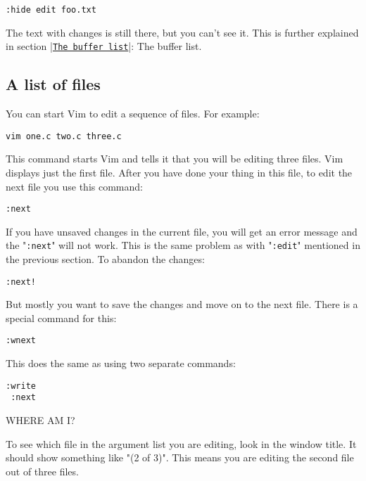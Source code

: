  \begin{Verbatim}[samepage=true]
 :hide edit foo.txt
 \end{Verbatim}

The text with changes is still there, but you can't see it.
This is further explained in section |\hyperref[The buffer list]{\texttt{The buffer list}}|: The buffer list.

\subsection{A list of files}
You can start Vim to edit a sequence of files.  For example:

 \begin{Verbatim}[samepage=true]
 vim one.c two.c three.c
 \end{Verbatim}

This command starts Vim and tells it that you will be editing three files.
Vim displays just the first file.
After you have done your thing in this file, to edit the next file you use this command:

 \begin{Verbatim}[samepage=true]
 :next
 \end{Verbatim}

If you have unsaved changes in the current file, you will get an error message and the "\verb!:next!" will not work.
This is the same problem as with "\verb!:edit!" mentioned in the previous section.
To abandon the changes:

 \begin{Verbatim}[samepage=true]
 :next!
 \end{Verbatim}

But mostly you want to save the changes and move on to the next file.
There is a special command for this:

 \begin{Verbatim}[samepage=true]
 :wnext
 \end{Verbatim}

This does the same as using two separate commands:

 \begin{Verbatim}[samepage=true]
 :write
 :next
 \end{Verbatim}

WHERE AM I?

To see which file in the argument list you are editing, look in the window title.
It should show something like "(2 of 3)".
This means you are editing the second file out of three files.

